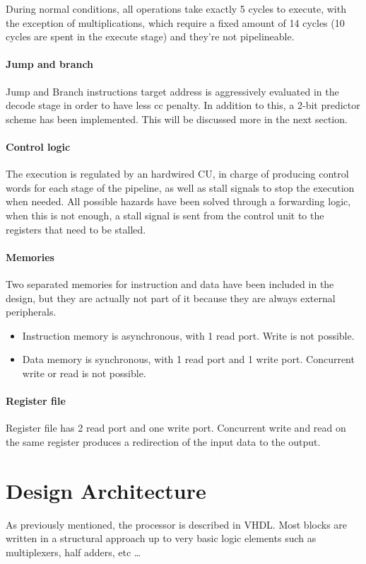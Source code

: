 \documentclass[12pt]{article}
\begin{document}
During normal conditions, all operations take exactly 5 cycles to execute, with the exception of multiplications, which require a fixed amount of 14 cycles (10 cycles are spent in the execute stage) and they're not pipelineable.

\paragraph{Jump and branch}
Jump and Branch instructions target address is aggressively evaluated in the decode stage in order to have less cc penalty.
In addition to this, a 2-bit predictor scheme has been implemented. This will be discussed more in the next section.

\paragraph{Control logic}
The execution is regulated by an hardwired CU, in charge of producing control words for each stage of the pipeline, as well as stall signals to stop the execution when needed.
All possible hazards have been solved through a forwarding logic, when this is not enough, a stall signal is sent from the control unit to the registers that need to be stalled.

\paragraph{Memories}
Two separated memories for instruction and data have been included in the design, but they are actually not part of it because they are always external peripherals.
\begin{itemize}
\item Instruction memory is asynchronous, with 1 read port. Write is not possible.
\item Data memory is synchronous, with 1 read port and 1 write port. Concurrent write or read is not possible.
\end{itemize}

\paragraph{Register file}
Register file has 2 read port and one write port. Concurrent write and read on the same register produces a redirection of the input data to the output.

\section{Design Architecture}\label{Design}
As previously mentioned, the processor is described in VHDL. Most blocks are written in a structural approach up to very basic logic elements such as multiplexers, half adders, etc \ldots
\end{document}
